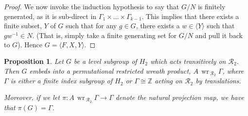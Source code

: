 \documentclass[11pt,a4paper]{amsart}
\newtheorem{proposition}[theorem]{Proposition}
\theoremstyle{definition}
\theoremstyle{remark}
\newcommand{\Z}{\mathbb Z}
\newcommand{\Ra}{\mathcal{R}}
\renewcommand{\wr}{\operatorname{\,wr\,}}
\begin{document}
\begin{proof}
	We now invoke the induction hypothesis to say that $G/N$ is finitely generated, as it is sub-direct in $\Gamma_1 \times \ldots  \times \Gamma_{k-1}$. This implies that there exists a finite subset, $Y$ of $G$ such that for any $g \in G$, there exists a $w \in \langle Y \rangle$ such that $g w^{-1} \in N$. (That is, simply take a finite generating set for $G/N$ and pull it back to $G$). Hence $G=\langle F, X, Y\rangle$. 
\end{proof}



\begin{proposition}
	\label{transitive infinite n=2}
	Let $G$ be a level subgroup of $H_2$ which acts transitively on $\Ra_2$. Then $G$ embeds into a permutational restricted wreath product, $A \wr_{\Ra_2} \Gamma$, where $\Gamma$ is either a finite index subgroup of $H_2$ or $\Gamma \cong \Z$ acting on $\Ra_2$ by translations. 
	
	
	Moreover, if we let $\pi: A \wr_{\Ra_2} \Gamma \to \Gamma$ denote the natural projection map, we have that $\pi(G) = \Gamma$. 
\end{proposition}
\end{document}
